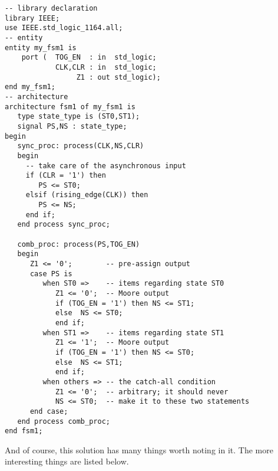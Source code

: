 \noindent
\begin{minipage}{0.99\linewidth}
\begin{lstlisting}[label=exe_18_code, caption=Solution to Example 18.]
-- library declaration
library IEEE;
use IEEE.std_logic_1164.all;
-- entity
entity my_fsm1 is 
    port (  TOG_EN  : in  std_logic; 
            CLK,CLR : in  std_logic; 
                 Z1 : out std_logic); 
end my_fsm1;
-- architecture
architecture fsm1 of my_fsm1 is
   type state_type is (ST0,ST1); 
   signal PS,NS : state_type; 
begin
   sync_proc: process(CLK,NS,CLR)
   begin
     -- take care of the asynchronous input
     if (CLR = '1') then 
        PS <= ST0;  
     elsif (rising_edge(CLK)) then 
        PS <= NS; 
     end if; 
   end process sync_proc; 

   comb_proc: process(PS,TOG_EN)
   begin
      Z1 <= '0';        -- pre-assign output
      case PS is 
         when ST0 =>    -- items regarding state ST0
            Z1 <= '0';  -- Moore output
            if (TOG_EN = '1') then NS <= ST1; 
            else  NS <= ST0; 
            end if; 
         when ST1 =>    -- items regarding state ST1
            Z1 <= '1';  -- Moore output
            if (TOG_EN = '1') then NS <= ST0; 
            else  NS <= ST1; 
            end if; 
         when others => -- the catch-all condition
            Z1 <= '0';  -- arbitrary; it should never 
            NS <= ST0;  -- make it to these two statements
      end case; 
   end process comb_proc; 
end fsm1;
\end{lstlisting}
\end{minipage}

And of course, this solution has many things worth noting in it. The more interesting things are listed below. 

